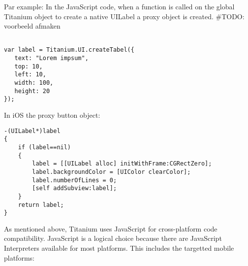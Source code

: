 Par example: In the JavaScript code, when a function is called on the global Titanium object to create a native UILabel a proxy object is created.
\#TODO: voorbeeld afmaken
\begin{verbatim}

var label = Titanium.UI.createTabel({
   text: "Lorem impsum",
   top: 10,
   left: 10,
   width: 100,
   height: 20
});
\end{verbatim}


In iOS the proxy button object:

\begin{verbatim}
-(UILabel*)label
{
    if (label==nil)
    {
        label = [[UILabel alloc] initWithFrame:CGRectZero];
        label.backgroundColor = [UIColor clearColor];
        label.numberOfLines = 0;
        [self addSubview:label];
    }
    return label;
}
\end{verbatim}



As mentioned above, Titanium uses JavaScript for cross-platform code compatibility. JavaScript is a logical choice because there are JavaScript Interpreters available for most platforms. This includes the targetted mobile platforms:

